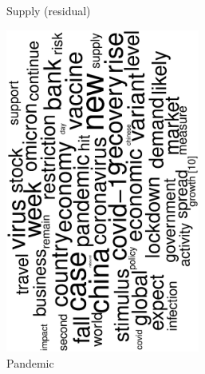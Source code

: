 \begin{figure}
\begin{subfigure}{0.32\textwidth}
		\caption{Supply (residual)}
	\end{subfigure}
	\begin{subfigure}{0.32\textwidth}
		\includegraphics[width=0.7\textwidth,angle=270]{figures/wordcloud3.eps}
		\caption{Pandemic}
	\end{subfigure}
	\begin{subfigure}{0.32\textwidth}

\end{subfigure}
\end{figure}
